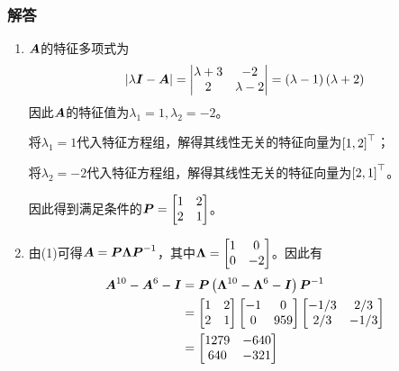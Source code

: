 \documentclass[9pt,xcolor=svgnames]{beamer} %
\begin{document}
\begin{frame}[allowframebreaks]
    \frametitle{解答}
    \begin{enumerate}
        \item {
              \(\boldsymbol{A}\)的特征多项式为
              \begin{equation*}
                  \left|\lambda\boldsymbol{I}-\boldsymbol{A} \right|=\begin{vmatrix}\lambda+3&-2\\2&\lambda-2\end{vmatrix}=\left( \lambda-1 \right)\left( \lambda+2 \right)
              \end{equation*}
              因此\(\boldsymbol{A}\)的特征值为\(\lambda_1=1,\lambda_2=-2\)。

              将\(\lambda_1=1\)代入特征方程组，解得其线性无关的特征向量为\(\left[ 1,2 \right]^\top\)；

              将\(\lambda_2=-2\)代入特征方程组，解得其线性无关的特征向量为\(\left[ 2,1 \right]^\top\)。

              因此得到满足条件的\(\boldsymbol{P}=\begin{bmatrix}1&2\\2&1\end{bmatrix}\)。
              }
        \item {
              由(1)可得\(\boldsymbol{A}=\boldsymbol{P}\boldsymbol{\Lambda}{\boldsymbol{P}}^{-1}\)，其中\(\boldsymbol{\Lambda}=\begin{bmatrix}1&0\\0&-2\end{bmatrix}\)。因此有
              \begin{align*}
                  \boldsymbol{A}^{10}-\boldsymbol{A}^6-\boldsymbol{I} & =\boldsymbol{P}\left( \boldsymbol{\Lambda}^{10}-\boldsymbol{\Lambda}^6-\boldsymbol{I} \right){\boldsymbol{P}}^{-1}                                                                       \\
                                           & =\begin{bmatrix}1&2\\2&1\end{bmatrix}\begin{bmatrix}-1&0\\0&959\end{bmatrix}\begin{bmatrix}-1/3&2/3\\2/3&-1/3\end{bmatrix} \\
                                           & =\begin{bmatrix}1279&-640\\640&-321\end{bmatrix}
              \end{align*}
              }
    \end{enumerate}
\end{frame}
\end{document}
